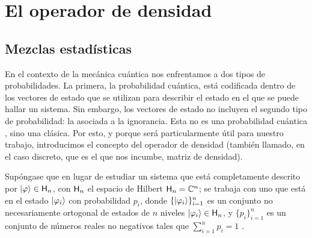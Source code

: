 \section{El operador de densidad}

\subsection{Mezclas estadísticas}

En el contexto de la mecánica cuántica nos enfrentamos a dos tipos de probabilidades. La primera, la probabilidad cuántica, está codificada dentro de los vectores de estado que se utilizan para describir el estado en el que se puede hallar un sistema. Sin embargo, los vectores de estado no incluyen el segundo tipo de probabilidad: la asociada a la ignorancia. Esta no es una probabilidad cuántica , sino una clásica. Por esto, y porque será particularmente útil para nuestro trabajo, introducimos el concepto del operador de densidad (también llamado, en el caso discreto, que es el que nos incumbe, matriz de densidad).

Supóngase que en lugar de estudiar un sistema que está completamente descrito por $\ket{\varphi}\in{\sf H}_{n}$, con ${\sf H}_{n}$ el espacio de Hilbert  ${\sf H}_{n}=\mathbb{C}^{n}$; se trabaja con uno que está en el estado $\ket{\varphi_{i}}$ con probabilidad $p_{i}$, donde $\{\ket{\varphi_{i}}\}_{i=1}^n$  es un conjunto no necesariamente ortogonal de estados de $n$ niveles $\ket{\varphi_{i}}\in{\sf H}_{n}$, y $\{p_{i}\}_{i=1}^n$  es un conjunto de números reales no negativos tales que $\sum_{i=1}^n p_{i}=1$ .


